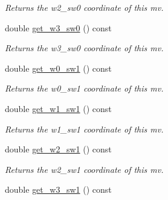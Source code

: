 \begin{DoxyCompactItemize}
\begin{DoxyCompactList}\small\item\em Returns the w2\-\_\-sw0 coordinate of this mv. \end{DoxyCompactList}\item 
\hypertarget{classe3ga_1_1mv_a0673c82b47d0fc94efc3a7d73acc1543}{double \hyperlink{classe3ga_1_1mv_a0673c82b47d0fc94efc3a7d73acc1543}{get\-\_\-w3\-\_\-sw0} () const }\label{classe3ga_1_1mv_a0673c82b47d0fc94efc3a7d73acc1543}

\begin{DoxyCompactList}\small\item\em Returns the w3\-\_\-sw0 coordinate of this mv. \end{DoxyCompactList}\item 
\hypertarget{classe3ga_1_1mv_af83549a8bc6bc5c00348fafa2992fdaf}{double \hyperlink{classe3ga_1_1mv_af83549a8bc6bc5c00348fafa2992fdaf}{get\-\_\-w0\-\_\-sw1} () const }\label{classe3ga_1_1mv_af83549a8bc6bc5c00348fafa2992fdaf}

\begin{DoxyCompactList}\small\item\em Returns the w0\-\_\-sw1 coordinate of this mv. \end{DoxyCompactList}\item 
\hypertarget{classe3ga_1_1mv_a30c047110c19fa0385340f658cc59e3a}{double \hyperlink{classe3ga_1_1mv_a30c047110c19fa0385340f658cc59e3a}{get\-\_\-w1\-\_\-sw1} () const }\label{classe3ga_1_1mv_a30c047110c19fa0385340f658cc59e3a}

\begin{DoxyCompactList}\small\item\em Returns the w1\-\_\-sw1 coordinate of this mv. \end{DoxyCompactList}\item 
\hypertarget{classe3ga_1_1mv_a67d65d01339b2e9acf245e2264d86749}{double \hyperlink{classe3ga_1_1mv_a67d65d01339b2e9acf245e2264d86749}{get\-\_\-w2\-\_\-sw1} () const }\label{classe3ga_1_1mv_a67d65d01339b2e9acf245e2264d86749}

\begin{DoxyCompactList}\small\item\em Returns the w2\-\_\-sw1 coordinate of this mv. \end{DoxyCompactList}\item 
\hypertarget{classe3ga_1_1mv_a5b7e964163a7cc8e82324de301048490}{double \hyperlink{classe3ga_1_1mv_a5b7e964163a7cc8e82324de301048490}{get\-\_\-w3\-\_\-sw1} () const }\label{classe3ga_1_1mv_a5b7e964163a7cc8e82324de301048490}


\end{DoxyCompactItemize}
